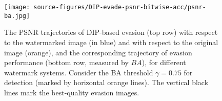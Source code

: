 

\begin{figure}[!htbp]
\centering
\texttt{[image: source-figures/DIP-evade-psnr-bitwise-acc/psnr-ba.jpg]}
\vspace{-1.5em}
\caption{The PSNR trajectories of DIP-based evasion (top row) with respect to the watermarked image (in blue) and with respect to the original image (orange), and the corresponding trajectory of evasion performance (bottom row, measured by $BA$), for different watermark systems. Consider the BA threshold $\gamma=0.75$ for detection (marked by horizontal orange lines). The vertical black lines mark the best-quality evasion images.}%
\vspace{-1em}
\label{Fig: DIP evade algo 2}
\end{figure}
